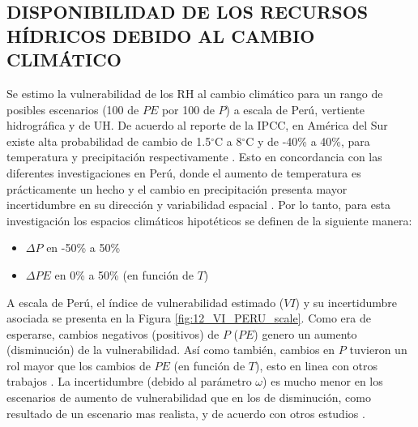 \documentclass[12pt]{article}
\begin{document}


\thispagestyle{empty}

\subsection{DISPONIBILIDAD DE LOS RECURSOS HÍDRICOS DEBIDO AL CAMBIO CLIMÁTICO}

Se estimo la vulnerabilidad de los RH al cambio climático para un rango de posibles escenarios (100 de $PE$ por 100 de $P$) a escala de Perú, vertiente hidrográfica y de UH. De acuerdo al reporte de la IPCC, en América del Sur existe alta probabilidad de cambio de 1.5$^{\circ}$C a 8$^{\circ}$C y de -40\% a 40\%, para temperatura y precipitación respectivamente
\citep{stocker2013climate}. Esto en concordancia con las diferentes investigaciones en Perú, donde el aumento de temperatura es prácticamente un hecho \citep{vuille2015impact,rosas2016towards,lopez2016recent,vicente2018recent,hunziker2018effects} y el cambio en precipitación presenta mayor incertidumbre en su dirección y variabilidad espacial \citep{zubieta2017spatial,de2017can,Aybar2019,Huerta2019a}. Por lo tanto, para esta investigación los espacios climáticos hipotéticos se definen de la siguiente manera:

\begin{itemize}

	\item $\Delta P$ en -50\% a 50\%
	\item $\Delta PE$ en 0\% a 50\% (en función de $T$)

\end{itemize}



A escala de Perú, el índice de vulnerabilidad estimado ($VI$) y su incertidumbre asociada se presenta en la Figura \ref{fig:12_VI_PERU_scale}. Como era de esperarse, cambios negativos (positivos) de $P$ ($PE$) genero un aumento (disminución) de la vulnerabilidad. Así como también, cambios en $P$ tuvieron un rol mayor que los cambios de $PE$ (en función de $T$), esto en linea con otros trabajos \citep{Singh2015,zhang2018bottom}. La incertidumbre (debido al parámetro $\omega$) es mucho menor en los escenarios de aumento de vulnerabilidad que en los de disminución, como resultado de un escenario mas realista, y de acuerdo con otros estudios \citep{singh2011trading,Singh2015,zhang2018bottom}.
\end{document}
